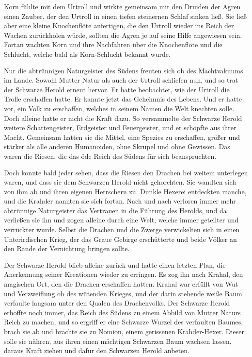 Korn fühlte mit dem Urtroll und wirkte gemeinsam mit den Druiden der Agren einen Zauber, der den Urtroll in einen tiefen steinernen Schlaf sinken ließ. Sie ließ aber eine kleine Knochenflöte anfertigen, die den Urtroll wieder ins Reich der Wachen zurückholen würde, sollten die Agren je auf seine Hilfe angewiesen sein. Fortan wachten Korn und ihre Nachfahren über die Knochenflöte und die Schlucht, welche bald als Korn-Schlucht bekannt wurde.

Nur die abtrünnigen Naturgeister des Südens freuten sich ob des Machtvakuums im Lande. Sowohl Mutter Natur als auch der Urtroll schliefen nun, und so trat der Schwarze Herold erneut hervor. Er hatte beobachtet, wie der Urtroll die Trolle erschaffen hatte. Er kannte jetzt das Geheimnis des Lebens. Und er hatte vor, ein Volk zu erschaffen, welches in seinem Namen die Welt knechten solle. Doch alleine hatte er nicht die Kraft dazu. So versammelte der Schwarze Herold weitere Schattengeister, Erdgeister und Feuergeister, und er schöpfte aus ihrer Macht. Gemeinsam hatten sie die Mittel, eine Spezies zu erschaffen, größer und stärker als alle anderen Humanoiden, ohne Skrupel und ohne Gewissen. Das waren die Riesen, die das öde Reich des Südens für sich beanspruchten.

Doch konnte bald jeder sehen, dass die Riesen den Drachen bei weitem unterlegen waren, und dass sie dem Schwarzen Herold nicht gehorchten. Sie wandten sich von ihm ab und ihren eigenen Herrschern zu. Dunkle Hexerei entdeckten manche, und die Krahder nannten sie sich fortan. Nach und nach verloren immer mehr abtrünnige Naturgeister das Vertrauen in die Führung des Herolds, und da verließen sie ihn und zogen alleine durch eine Welt, welche immer geteilter und verrückter wurde. Selbst die Drachen und die Zwerge verwickelten sich in einen Unterirdischen Krieg, der das Graue Gebirge erschütterte und beide Völker an den Rande der Vernichtung bringen sollte.

Der Schwarze Herold blieb alleine zurück und hatte einen letzten Plan, die Anerkennung seiner Kreationen wieder zu erringen. Es zog ihn nach Krahal, den magischen Ort, den die Drachen erschaffen hatten. Krahal war erfüllt von Wut und Verzweiflung ob des wütenden Krieges, und der darin stehende weiße Baum verfaulte langsam unter den Qualen des Drachenvolks. Der Schwarze Herold erhoffte noch immer, das Reich des Südens zu einem Abbild von Mutter Naturs Reich zu machen, und so ergriff er eine Schwarze Wurzel des verfaulten Baumes, brach sie ab und brachte sie zu Nomion, einem gerissenen Krahder-Hexer. Dieser solle sie nähren, aus ihren einen mächtigen Schwarzen Baum wachsen lassen, daraus Kraft ziehen und dafür den Schwarzen Herold anbeten.


